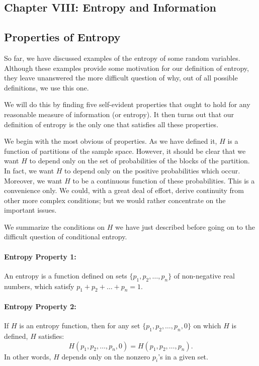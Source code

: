 \documentclass{report}
\begin{document}
\subsection*{Chapter VIII: Entropy and Information}
\normalsize
\subsection*{Properties of Entropy}

So far, we have discussed examples of the entropy of some random variables. Although these examples provide some motivation for our definition of entropy, they leave unanswered the more difficult question of why, out of all possible definitions, we use this one.

We will do this by finding five self-evident properties that ought to hold for any reasonable measure of information (or entropy). It then turns out that our definition of entropy is the only one that satisfies all these properties.

We begin with the most obvious of properties. As we have defined it, \( H \) is a function of partitions of the sample space. However, it should be clear that we want \( H \) to depend only on the set of probabilities of the blocks of the partition. In fact, we want \( H \) to depend only on the positive probabilities which occur. Moreover, we want \( H \) to be a continuous function of these probabilities. This is a convenience only. We could, with a great deal of effort, derive continuity from other more complex conditions; but we would rather concentrate on the important issues. 

We summarize the conditions on \( H \) we have just described before going on to the difficult question of conditional entropy.

\paragraph{Entropy Property 1:} 
An entropy is a function defined on sets \( \{p_1, p_2, \ldots, p_n\} \) of non-negative real numbers, which satisfy \( p_1 + p_2 + \ldots + p_n = 1 \).

\paragraph{Entropy Property 2:} 
If \( H \) is an entropy function, then for any set \( \{p_1, p_2, \ldots, p_n, 0\} \) on which \( H \) is defined, \( H \) satisfies:
\[
H(p_1, p_2, \ldots, p_n, 0) = H(p_1, p_2, \ldots, p_n).
\]
In other words, \( H \) depends only on the nonzero \( p_i \)'s in a given set.
\end{document}
